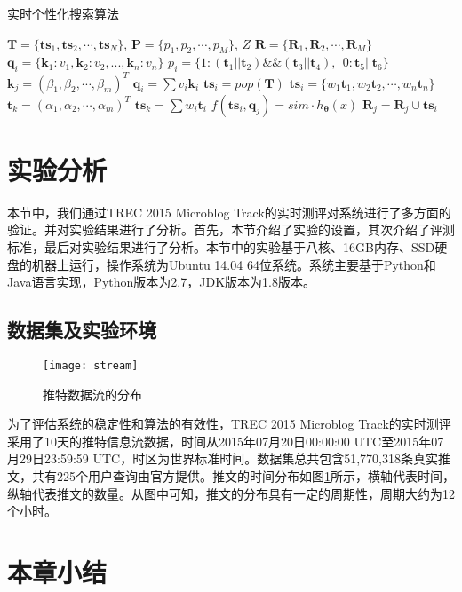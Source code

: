 \begin{algorithm}[!ht]
\caption{实时个性化搜索算法}
\label{alg:livePush}
\begin{algorithmic}[1]
  \REQUIRE $\mathbf{T} = \{ \mathbf{ts}_1, \mathbf{ts}_2, \cdots, \mathbf{ts}_N \}$, $\mathbf{P} = \{ p_1, p_2, \cdots, p_M \}$, $Z$
  \ENSURE $\mathbf{R} = \{ \mathbf{R}_1, \mathbf{R}_2, \cdots, \mathbf{R}_M \}$
    \STATE $\mathbf{q}_i = \{ {\mathbf{k}_1}:{v_1},{\mathbf{k}_2}:{v_2},...,{\mathbf{k}_n}:{v_n}\}$
    \STATE $p_i = \{1:\left(\mathbf{t}_1 || \mathbf{t}_2\right) \& \& \left(\mathbf{t}_3 || \mathbf{t}_4\right),~~0:\mathbf{t}_5 || \mathbf{t}_6\}$
  \ENDFOR
    \STATE $\mathbf{k}_j = \left(\beta_1,\beta_2,\cdots,\beta_m\right)^T$
    \STATE $\mathbf{q}_i = \sum v_i \mathbf{k}_i$
  \ENDFOR
    \STATE $\mathbf{ts}_i = pop\left(\mathbf{T}\right)$
    \STATE $\mathbf{ts}_i = \{ {w_1}{\mathbf{t}_1},{w_2}{\mathbf{t}_2},\cdots,{w_n}{\mathbf{t}_n}\}$
       \STATE $\mathbf{t}_k=\left(\alpha_1,\alpha_2,\cdots,\alpha_m\right)^T$
     \ENDFOR
     \STATE $\mathbf{ts}_k = \sum w_i \mathbf{t}_i$
     \STATE $f\left( \mathbf{ts}_i, \mathbf{q}_j \right) = sim \cdot {h_ {\bm{\theta}}}\left(x\right)$
    \ENDIF
      \STATE $\mathbf{R}_j = \mathbf{R}_j \cup \mathbf{ts}_i$
    \ENDIF
  \ENDWHILE
\end{algorithmic}
\end{algorithm}

\section{实验分析}
\label{sec2:experiment}
本节中，我们通过TREC 2015 Microblog Track的实时测评对系统进行了多方面的验证。并对实验结果进行了分析。首先，本节介绍了实验的设置，其次介绍了评测标准，最后对实验结果进行了分析。本节中的实验基于八核、16GB内存、SSD硬盘的机器上运行，操作系统为Ubuntu 14.04 64位系统。系统主要基于Python和Java语言实现，Python版本为2.7，JDK版本为1.8版本。

\subsection{数据集及实验环境}
\label{subsec2:dataset}
\begin{figure}[!htbp]
  \centering
  \texttt{[image: stream]}
  \caption{推特数据流的分布}
  \label{fig:twitterDis}
\end{figure}

为了评估系统的稳定性和算法的有效性，TREC 2015 Microblog Track的实时测评采用了10天的推特信息流数据，时间从2015年07月20日00:00:00 UTC至2015年07月29日23:59:59 UTC，时区为世界标准时间。数据集总共包含51,770,318条真实推文，共有225个用户查询由官方提供。推文的时间分布如图\ref{fig:twitterDis}所示，横轴代表时间，纵轴代表推文的数量。从图中可知，推文的分布具有一定的周期性，周期大约为12个小时。

\section{本章小结}
\label{sec2:conclusion}


